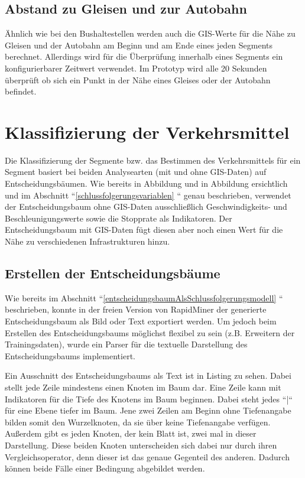 \subsection{Abstand zu Gleisen und zur Autobahn}
\label{abstand-gleis-autobahn}
Ähnlich wie bei den Bushaltestellen werden auch die GIS-Werte für die Nähe zu Gleisen und der Autobahn am Beginn und am Ende eines jeden Segments berechnet. Allerdings wird für die Überprüfung innerhalb eines Segments ein konfigurierbarer Zeitwert verwendet. Im Prototyp wird alle 20 Sekunden überprüft ob sich ein Punkt in der Nähe eines Gleises oder der Autobahn befindet.

\section{Klassifizierung der Verkehrsmittel}
Die Klassifizierung der Segmente bzw. das Bestimmen des Verkehrsmittels für ein Segment basiert bei beiden Analysearten (mit und ohne GIS-Daten) auf Entscheidungsbäumen. Wie bereits in Abbildung  und in Abbildung  ersichtlich und im Abschnitt ``\ref{schlussfolgerungsvariablen} `` genau beschrieben, verwendet der Entscheidungsbaum ohne GIS-Daten ausschließlich Geschwindigkeits- und Beschleunigungswerte sowie die Stopprate als Indikatoren. Der Entscheidungsbaum mit GIS-Daten fügt diesen aber noch einen Wert für die Nähe zu verschiedenen Infrastrukturen hinzu.


\subsection{Erstellen der Entscheidungsbäume}
\label{entscheidungsbaumGenerierungPHP}
Wie bereits im Abschnitt ``\ref{entscheidungsbaumAlsSchlussfolgerungsmodell} `` beschrieben, konnte in der freien Version von RapidMiner der generierte Entscheidungsbaum als Bild oder Text exportiert werden. Um jedoch beim Erstellen des Entscheidungsbaums möglichst flexibel zu sein (z.B. Erweitern der Trainingsdaten), wurde ein Parser für die textuelle Darstellung des Entscheidungsbaums implementiert. 

Ein Ausschnitt des Entscheidungsbaums als Text ist in Listing  zu sehen. Dabei stellt jede Zeile mindestens einen Knoten im Baum dar. Eine Zeile kann mit Indikatoren für die Tiefe des Knotens im Baum beginnen. Dabei steht jedes ``|`` für eine Ebene tiefer im Baum. Jene zwei Zeilen am Beginn ohne Tiefenangabe bilden somit den Wurzelknoten, da sie über keine Tiefenangabe verfügen. Außerdem gibt es jeden Knoten, der kein Blatt ist, zwei mal in dieser Darstellung. Diese beiden Knoten unterscheiden sich dabei nur durch ihren Vergleichsoperator, denn dieser ist das genaue Gegenteil des anderen. Dadurch können beide Fälle einer Bedingung abgebildet werden.

